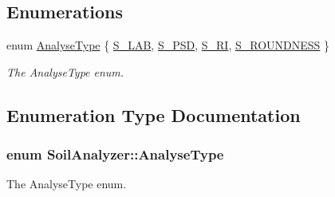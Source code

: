 \subsection*{Enumerations}
\begin{DoxyCompactItemize}
\item 
enum \hyperlink{namespace_soil_analyzer_a4fda1552be67ca3afa21a0e328ce20b1}{Analyse\+Type} \{ \hyperlink{namespace_soil_analyzer_a4fda1552be67ca3afa21a0e328ce20b1a00a4725e08e412784be26a1712ddc0e8}{S\+\_\+\+L\+A\+B}, 
\hyperlink{namespace_soil_analyzer_a4fda1552be67ca3afa21a0e328ce20b1a05f4e00557f8e26c29892bde8a130df6}{S\+\_\+\+P\+S\+D}, 
\hyperlink{namespace_soil_analyzer_a4fda1552be67ca3afa21a0e328ce20b1a2e919e63ee899d56718e0f9143983fb8}{S\+\_\+\+R\+I}, 
\hyperlink{namespace_soil_analyzer_a4fda1552be67ca3afa21a0e328ce20b1ad2ec0fc01286dbe9e8a1b08c5fa20c1f}{S\+\_\+\+R\+O\+U\+N\+D\+N\+E\+S\+S}
 \}
\begin{DoxyCompactList}\small\item\em The Analyse\+Type enum. \end{DoxyCompactList}\end{DoxyCompactItemize}


\subsection{Enumeration Type Documentation}
\hypertarget{namespace_soil_analyzer_a4fda1552be67ca3afa21a0e328ce20b1}{}
\subsubsection[{Analyse\+Type}]{\setlength{\rightskip}{0pt plus 5cm}enum {\bf Soil\+Analyzer\+::\+Analyse\+Type}}\label{namespace_soil_analyzer_a4fda1552be67ca3afa21a0e328ce20b1}


The Analyse\+Type enum. 

